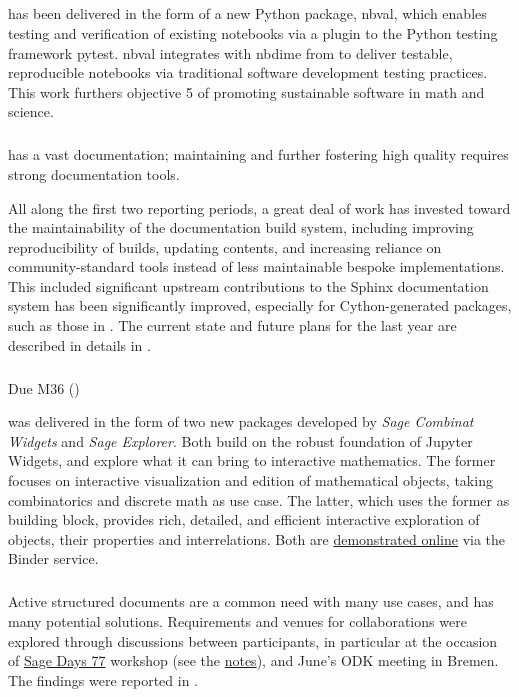\subparagraph{}

 has been delivered in the form of a new Python package, nbval,
which enables testing and verification of existing notebooks via a plugin to the Python testing
framework pytest. nbval integrates with nbdime from  to deliver
testable, reproducible notebooks via traditional software development testing practices.
This work furthers \ODK objective 5 of promoting sustainable software in math and science.

\subparagraph{}
\label{UI@sage-sphinx}

\Sage has a vast documentation; maintaining and further fostering high
quality requires strong documentation tools.

All along the first two reporting periods, a great deal of work has
invested toward the maintainability of the \Sage documentation build
system, including improving reproducibility of builds, updating
contents, and increasing reliance on community-standard tools instead
of less maintainable bespoke implementations. This included
significant upstream contributions to the Sphinx documentation system
has been significantly improved, especially for Cython-generated
packages, such as those in . The current state
and future plans for the last year are described in details in
.

\subparagraph{} Due M36 ()

 was delivered in the
form of two new packages developed by \ODK \emph{Sage Combinat
  Widgets} and \emph{Sage Explorer}. Both build on the robust
foundation of Jupyter Widgets, and explore what it can bring to
interactive mathematics. The former focuses on interactive
visualization and edition of mathematical objects, taking
combinatorics and discrete math as use case. The latter, which uses
the former as building block, provides rich, detailed, and efficient
interactive exploration of objects, their properties and
interrelations. Both are
\href{https://github.com/sagemath/sage-explorer}{demonstrated online}
via the Binder service.

\subparagraph{}

Active structured documents are a common need with many use cases, and has many potential solutions.
Requirements and venues for collaborations were explored through discussions between participants,
in particular at the occasion of \href{https://wiki.sagemath.org/days77/}{Sage Days 77} workshop
(see the \href{https://wiki.sagemath.org/days77/live-structured-documents}{notes}), and June's ODK
meeting in Bremen. The findings were reported in .

